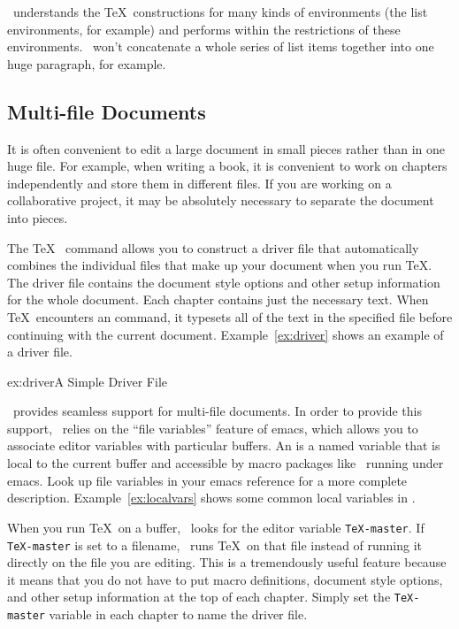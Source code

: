 \auctex\ understands the \TeX\ constructions for many kinds of environments
(the list environments, for example) and 
performs  within 
the restrictions of these environments.  \auctex\ won't concatenate a 
whole series of list items together into one huge paragraph, for example.

\subsection{Multi-file Documents}
\label{sec:multifile}

It is often convenient to edit a large document in small 
pieces rather
than in one huge file.  For example, when writing a book, it is convenient
to work on chapters independently and store them in different files.  If
you are working on a collaborative project, it may be absolutely necessary
to separate the document into pieces.

The \TeX\  command allows you to construct a driver file
that automatically combines the individual files that make up your
document when you run \TeX.  The driver file contains the document
style options and other setup information for the whole document.
Each chapter contains just the necessary text.  When \TeX\ encounters
an  command, it typesets all of the
text in the specified file before continuing with the current document.
Example~\ref{ex:driver} shows an example of a driver file.

\begin{example}{ex:driver}{A Simple Driver File}

   
   
   

\end{example}

\auctex\ provides seamless support for multi-file documents.
In order to provide this support, \auctex\ relies on the ``file variables''
feature of emacs, which allows you to associate editor variables
with particular buffers.
An  is 
a named variable that
is local to the current buffer and accessible by macro packages like
\auctex\ running under emacs.
Look up file variables in your emacs reference for a more complete
description.  Example~\ref{ex:localvars} shows some common local
variables in \auctex.

\pagebreak
When you run \TeX\ on a buffer, \auctex\ looks for the editor variable
\verb|TeX-master|.  If \verb|TeX-master| is set to a filename, 
\auctex\ runs \TeX\ on that file instead of running it directly on the file 
you are editing.
This is a tremendously useful feature because it means that you do not
have to put macro definitions, document style options, and other setup
information at the top of each chapter.  Simply set the \verb|TeX-master|
variable in each chapter to name the driver file.

